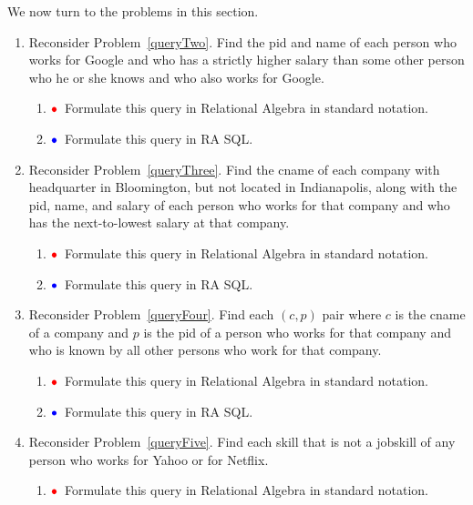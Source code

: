 \documentclass[11pt]{article}
\newcommand{\red}[1]{{\color{red}#1}}
\newcommand{\blue}[1]{{\color{blue}#1}}
\newcommand{\redbullet}{$\red{\bullet}$}
\newcommand{\bluebullet}{$\blue{\bullet}$}
\begin{document}
\newpage

We now turn to the problems in this section.
\begin{enumerate}[resume]
\item Reconsider Problem~\ref{queryTwo}.
Find the pid and name of each person who works for Google and who has a strictly higher salary
than some other person who he or she knows and who also works for Google.
\begin{enumerate}
\item  \redbullet\  Formulate this query in Relational Algebra in standard notation.

\item \bluebullet\  Formulate this query in RA SQL.
\end{enumerate}

\item Reconsider Problem~\ref{queryThree}.
Find the cname of each company with headquarter in Bloomington, but not located in Indianapolis, along with the pid, name, and salary
of each person who works for that company and who has the next-to-lowest salary
at that company.

\begin{enumerate}
\item  \redbullet\ Formulate this query in Relational Algebra in standard notation.


\item   \bluebullet\ Formulate this query in RA SQL.

\end{enumerate}
\item Reconsider Problem~\ref{queryFour}.  Find each $(c,p)$ pair where $c$ is the cname of a company and $p$ is the pid of a person who works
for that company and who is known by all other persons who work for that company.
\begin{enumerate}
\item  \redbullet\ Formulate this query in Relational Algebra in standard notation.


\item   \bluebullet\ 
Formulate this query in RA SQL.
\end{enumerate}

\item Reconsider Problem~\ref{queryFive}. Find each skill that is not a jobskill of any person who works for Yahoo or for Netflix.

\begin{enumerate}
\item  \redbullet\ Formulate this query in Relational Algebra in standard notation.


\end{enumerate}
\end{enumerate}
\end{document}
